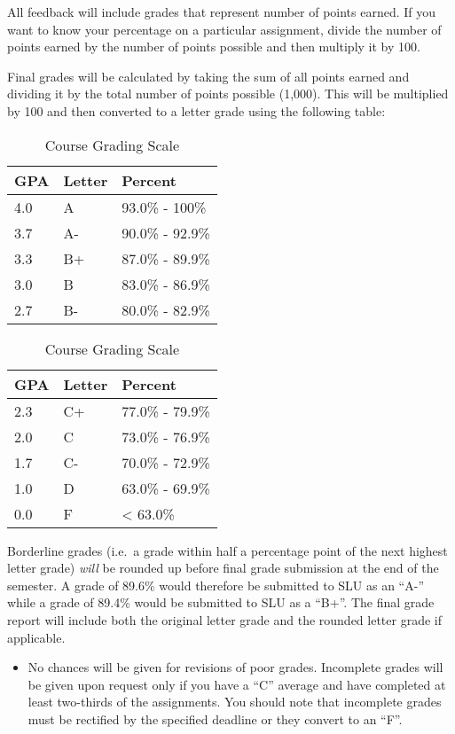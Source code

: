 \documentclass[]{book}
\newenvironment{rmdblock}[1]
  {\begin{shaded*}
  \begin{itemize}
  \renewcommand{\labelitemi}{
    \raisebox{-.7\height}[0pt][0pt]{
      {\setkeys{Gin}{width=3em,keepaspectratio}\texttt{[image: images/\#1]}}
    }
  }
  \item
  }
  {
  \end{itemize}
  \end{shaded*}
  }
\newenvironment{rmdwarning}
  {\begin{rmdblock}{warning}}
  {\end{rmdblock}}
\theoremstyle{definition}
\theoremstyle{definition}
\theoremstyle{definition}
\theoremstyle{remark}
\begin{document}
All feedback will include grades that represent number of points earned.
If you want to know your percentage on a particular assignment, divide
the number of points earned by the number of points possible and then
multiply it by 100.

Final grades will be calculated by taking the sum of all points earned
and dividing it by the total number of points possible (1,000). This
will be multiplied by 100 and then converted to a letter grade using the
following table:

\begin{table}
\caption{\label{tab:unnamed-chunk-9}Course Grading Scale}

\centering
\begin{tabular}[t]{lll}
\toprule
GPA & Letter & Percent\\
\midrule
4.0 & A & 93.0\% - 100\%\\
3.7 & A- & 90.0\% - 92.9\%\\
3.3 & B+ & 87.0\% - 89.9\%\\
3.0 & B & 83.0\% - 86.9\%\\
2.7 & B- & 80.0\% - 82.9\%\\
\bottomrule
\end{tabular}
\centering
\begin{tabular}[t]{lll}
\toprule
GPA & Letter & Percent\\
\midrule
2.3 & C+ & 77.0\% - 79.9\%\\
2.0 & C & 73.0\% - 76.9\%\\
1.7 & C- & 70.0\% - 72.9\%\\
1.0 & D & 63.0\% - 69.9\%\\
0.0 & F & < 63.0\%\\
\bottomrule
\end{tabular}
\end{table}

Borderline grades (i.e.~a grade within half a percentage point of the
next highest letter grade) \emph{will} be rounded up before final grade
submission at the end of the semester. A grade of 89.6\% would therefore
be submitted to SLU as an ``A-'' while a grade of 89.4\% would be
submitted to SLU as a ``B+''. The final grade report will include both
the original letter grade and the rounded letter grade if applicable.

\begin{rmdwarning}
No chances will be given for revisions of poor grades. Incomplete grades
will be given upon request only if you have a ``C'' average and have
completed at least two-thirds of the assignments. You should note that
incomplete grades must be rectified by the specified deadline or they
convert to an ``F''.
\end{rmdwarning}
\end{document}
